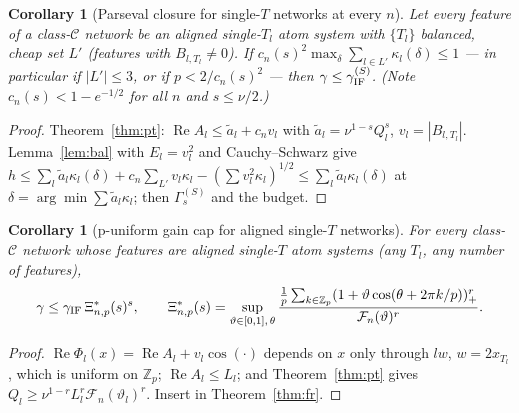 \documentclass[11pt]{article}
\newtheorem{corollary}[theorem]{Corollary}
\theoremstyle{remark}
\renewcommand{\Re}{\operatorname{Re}}
\begin{document}
\begin{corollary}[Parseval closure for single-$T$ networks at every $n$]
Let every feature of a class-$\mathcal C$ network be an aligned single-$T_l$ atom system with $\{T_l\}$ balanced, cheap set $L'$
(features with $B_{l,T_l}\ne0$). If $c_n(s)^2\max_\delta\sum_{l\in L'}\kappa_l(\delta)\le1$ --- in particular if $|L'|\le3$, or if
$p<2/c_n(s)^2$ --- then $\gamma\le\gamma^{(S)}_{\rm IF}$. (Note $c_n(s)<1-e^{-1/2}$ for all $n$ and $s\le\nu/2$.)
\end{corollary}
\begin{proof}
Theorem~\ref{thm:pt}: $\Re A_l\le\tilde a_l+c_nv_l$ with $\tilde a_l=\nu^{1-s}Q_l^s$, $v_l=|B_{l,T_l}|$. Lemma~\ref{lem:bal} with $E_l=v_l^2$ and
Cauchy--Schwarz give $h\le\sum_l\tilde a_l\kappa_l(\delta)+c_n\sum_{L'}v_l\kappa_l-(\sum v_l^2\kappa_l)^{1/2}\le\sum_l\tilde a_l\kappa_l(\delta)$ at
$\delta=\arg\min\sum\tilde a_l\kappa_l$; then $\Gamma^{(S)}_s$ and the budget.
\end{proof}

\begin{corollary}[p-uniform gain cap for aligned single-$T$ networks]
For every class-$\mathcal C$ network whose features are aligned single-$T$ atom systems (any $T_l$, any number of features),
\[\gamma\le\gamma_{\rm IF}\,\Xi^*_{n,p}(s)^s,\qquad
\Xi^*_{n,p}(s)=\sup_{\vartheta\in[0,1],\,\theta}\frac{\frac1p\sum_{k\in\mathbb Z_p}(1+\vartheta\cos(\theta+2\pi k/p))_+^r}{\mathcal F_n(\vartheta)^r}.\]
\end{corollary}
\begin{proof}
$\Re\Phi_l(x)=\Re A_l+v_l\cos(\cdot)$ depends on $x$ only through $lw$, $w=2x_{T_l}$, which is uniform on $\mathbb Z_p$; $\Re A_l\le L_l$; and
Theorem~\ref{thm:pt} gives $Q_l\ge\nu^{1-r}L_l^r\mathcal F_n(\vartheta_l)^r$. Insert in Theorem~\ref{thm:fr}.
\end{proof}
\end{document}
